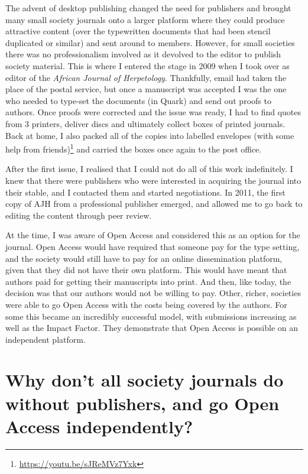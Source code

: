 \documentclass[
]{krantz}
\renewcommand{\href}[2]{#2\footnote{\url{#1}}}
\begin{document}
The advent of desktop publishing changed the need for publishers and brought many small society journals onto a larger platform where they could produce attractive content (over the typewritten documents that had been stencil duplicated or similar) and sent around to members. However, for small societies there was no professionalism involved as it devolved to the editor to publish society material. This is where I entered the stage in 2009 when I took over as editor of the \emph{African Journal of Herpetology}. Thankfully, email had taken the place of the postal service, but once a manuscript was accepted I was the one who needed to type-set the documents (in Quark) and send out proofs to authors. Once proofs were corrected and the issue was ready, I had to find quotes from 3 printers, deliver discs and ultimately collect boxes of printed journals. Back at home, I also packed all of the copies into labelled envelopes \href{https://youtu.be/sJReMVz7Yxk}{(with some help from friends)} and carried the boxes once again to the post office.



After the first issue, I realised that I could not do all of this work indefinitely. I knew that there were publishers who were interested in acquiring the journal into their stable, and I contacted them and started negotiations. In 2011, the first copy of AJH from a professional publisher emerged, and allowed me to go back to editing the content through peer review.

At the time, I was aware of Open Access and considered this as an option for the journal. Open Access would have required that someone pay for the type setting, and the society would still have to pay for an online dissemination platform, given that they did not have their own platform. This would have meant that authors paid for getting their manuscripts into print. And then, like today, the decision was that our authors would not be willing to pay. Other, richer, societies were able to go Open Access with the costs being covered by the authors. For some this became an incredibly successful model, with submissions increasing as well as the Impact Factor. They demonstrate that Open Access is possible on an independent platform.

\hypertarget{why-dont-all-society-journals-do-without-publishers-and-go-open-access-independently}{%
\section{Why don't all society journals do without publishers, and go Open Access independently?}\label{why-dont-all-society-journals-do-without-publishers-and-go-open-access-independently}}
\end{document}
